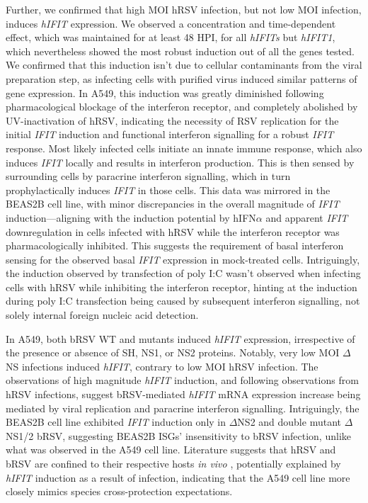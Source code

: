 Further, we confirmed that high MOI hRSV infection, but not low MOI infection, induces \textit{hIFIT} expression. We observed a concentration and time-dependent effect, which was maintained for at least 48 HPI, for all \textit{hIFITs} but \textit{hIFIT1}, which nevertheless showed the most robust induction out of all the genes tested. We confirmed that this induction isn't due to cellular contaminants from the viral preparation step, as infecting cells with purified virus induced similar patterns of gene expression. In A549, this induction was greatly diminished following pharmacological blockage of the interferon receptor, and completely abolished by UV-inactivation of hRSV, indicating the necessity of RSV replication for the initial \textit{IFIT} induction and functional interferon signalling for a robust \textit{IFIT} response. Most likely infected cells initiate an innate immune response, which also induces \textit{IFIT} locally and results in interferon production. This is then sensed by surrounding cells by paracrine interferon signalling, which in turn prophylactically induces \textit{IFIT} in those cells. This data was mirrored in the BEAS2B cell line, with minor discrepancies in the overall magnitude of \textit{IFIT} induction—aligning with the induction potential by hIFN$\alpha$ and apparent \textit{IFIT} downregulation in cells infected with hRSV while the interferon receptor was pharmacologically inhibited. This suggests the requirement of basal interferon sensing for the observed basal \textit{IFIT} expression in mock-treated cells. Intriguingly, the induction observed by transfection of poly I:C wasn't observed when infecting cells with hRSV while inhibiting the interferon receptor, hinting at the induction during poly I:C transfection being caused by subsequent interferon signalling, not solely internal foreign nucleic acid detection.

In A549, both bRSV WT and mutants induced \textit{hIFIT} expression, irrespective of the presence or absence of SH, NS1, or NS2 proteins. Notably, very low MOI $\Delta$NS infections induced \textit{hIFIT}, contrary to low MOI hRSV infection. The observations of high magnitude \textit{hIFIT} induction, and following observations from hRSV infections, suggest bRSV-mediated \textit{hIFIT} mRNA expression increase being mediated by viral replication and paracrine interferon signalling. Intriguingly, the BEAS2B cell line exhibited \textit{IFIT} induction only in $\Delta$NS2 and double mutant $\Delta$NS1/2 bRSV, suggesting BEAS2B ISGs' insensitivity to bRSV infection, unlike what was observed in the A549 cell line. Literature suggests that hRSV and bRSV are confined to their respective hosts \textit{in vivo} \cite{Buchholz2000ChimericVaccine}, potentially explained by \textit{hIFIT} induction as a result of infection, indicating that the A549 cell line more closely mimics species cross-protection expectations.


